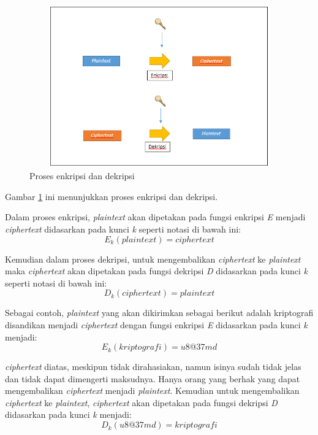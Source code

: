 \begin{figure}[h]
\includegraphics[width=12cm,height=7cm]{Gambar/encryption_decryption}
\centering
\caption{Proses enkripsi dan dekripsi}
\label{fig:prosesenkripsidekripsi}
\end{figure}

Gambar \ref{fig:prosesenkripsidekripsi} ini menunjukkan proses enkripsi dan dekripsi.

Dalam proses enkripsi, \textit{plaintext} akan dipetakan pada fungsi enkripsi \textit{E} menjadi \textit{ciphertext} didasarkan pada kunci \textit{k} seperti notasi di bawah ini:
\begin{displaymath}
	E_k(plaintext) = ciphertext
\end{displaymath}

Kemudian dalam proses dekripsi, untuk mengembalikan \textit{ciphertext} ke \textit{plaintext} maka \textit{ciphertext} akan dipetakan pada fungsi dekripsi \textit{D} didasarkan pada kunci \textit{k} seperti notasi di bawah ini:
\begin{displaymath}
	D_k(ciphertext)=plaintext
\end{displaymath}

Sebagai contoh, \textit{plaintext} yang akan dikirimkan sebagai berikut adalah kriptografi disandikan menjadi \textit{ciphertext} dengan fungsi enkripsi \textit{E} didasarkan pada kunci \textit{k} menjadi:
\begin{displaymath}
E_k(kriptografi)=u8@37md
\end{displaymath}

\noindent \textit{ciphertext} diatas, meskipun tidak dirahasiakan, namun isinya sudah tidak jelas dan tidak dapat dimengerti maksudnya. Hanya orang yang berhak yang dapat mengembalikan \textit{ciphertext} menjadi \textit{plaintext}. Kemudian untuk mengembalikan \textit{ciphertext} ke \textit{plaintext}, \textit{ciphertext} akan dipetakan pada fungsi dekripsi \textit{D} didasarkan pada kunci \textit{k} menjadi:
\begin{displaymath}
D_k(u8@37md)=kriptografi
\end{displaymath}

